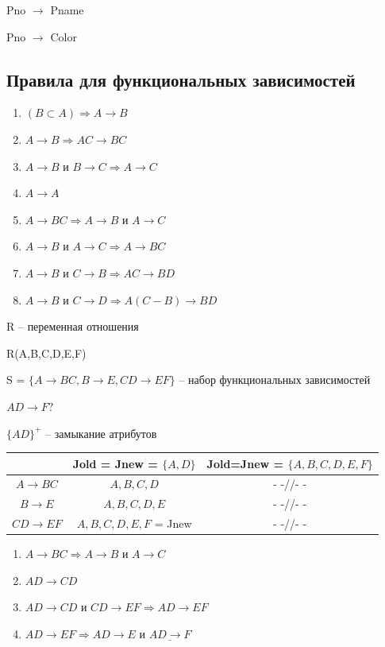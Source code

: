 \documentclass[a4paper, 14pt]{report}
\begin{document}
Pno $\to$ Pname

Pno $\to$ Color

\subsection{Правила для функциональных зависимостей}

\begin{enumerate}
    \item $(B \subset A) \Rightarrow A \to B$
    \item $A \to B \Rightarrow AC \to BC$
    \item $A \to B \text{ и } B \to C \Rightarrow A \to C$
    \item $A \to A$
    \item $A \to BC \Rightarrow A \to B \text{ и } A \to C$
    \item $A \to B \text{ и } A \to C \Rightarrow A \to BC$
    \item $A \to B \text{ и } C \to B \Rightarrow AC \to BD$
    \item $A \to B \text{ и } C \to D \Rightarrow A(C - B) \to BD$
\end{enumerate}

R -- переменная отношения

R(A,B,C,D,E,F)

S = $\{ A \to BC, B \to E, CD \to EF \}$ -- набор функциональных зависимостей

$AD \to F ?$

$\{AD\}^+$ -- замыкание атрибутов

\begin{tabular}{|c|c|c|}
    \hline
    & Jold = Jnew = $\{ A,D \}$ & Jold=Jnew = $\{ A,B,C,D,E,F \}$\\
    \hline
    $A \to BC$ & $A,B,C,D$ & - -//- - \\
    \hline
    $B \to E$ & $A,B,C,D,E$ & - -//- - \\
    \hline
    $CD \to EF$ & $A,B,C,D,E,F$ = Jnew & - -//- - \\
    \hline
\end{tabular}

\begin{enumerate}
    \item $A \to BC \Rightarrow A \to B \text{ и } A \to C$
    \item $AD \to CD$
    \item $AD \to CD \text{ и } CD \to EF \Rightarrow AD \to EF$
    \item $AD \to EF \Rightarrow AD \to E \text{ и } \underline{AD \to F }$
\end{enumerate}
\end{document}

